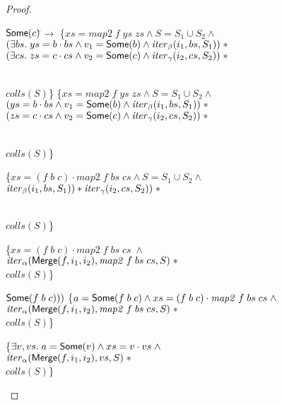 \begin{proof}
\begin{itemize}
\begin{specification}
\nextline \> \;\;\; $\mathsf{Some}(c)$\=$ \to $ 
\nextline \> \> \{$xs = \mathit{map2}\;f\;ys\;zs \land 
                  S = S_1 \cup S_2 \land$ 
\\ \> \> \>\;\;    $(\exists bs.\; ys = b\cdot bs \land v_1 = \mathsf{Some}(b) \land 
                                \mathit{iter}_\beta(i_1, bs, S_1)) \;*$
\\ \> \> \>\;\;    $(\exists cs.\; zs = c\cdot cs \land v_2 = \mathsf{Some}(c) \land 
                                \mathit{iter}_\gamma(i_2, cs, S_2)) \;*$

\\ \> \> \>\;     $\mathit{colls}(S)$\}
\nextline \> \> \{$xs = \mathit{map2}\;f\;ys\;zs \land 
                  S = S_1 \cup S_2 \land$ 
\\ \> \> \>\;    $(ys = b\cdot bs \land v_1 = \mathsf{Some}(b) \land 
                                \mathit{iter}_\beta(i_1, bs, S_1)) \;*$
\\ \> \> \>\;    $(zs = c\cdot cs \land v_2 = \mathsf{Some}(c) \land 
                                \mathit{iter}_\gamma(i_2, cs, S_2)) \;*$

\\ \> \> \>\;     $\mathit{colls}(S)$\}

\nextline \> \> \{$xs = (f\;b\;c) \cdot \mathit{map2}\;f\;bs\;cs \land 
                  S = S_1 \cup S_2 \land$ 
\\ \> \> \>\;    $\mathit{iter}_\beta(i_1, bs, S_1)) * \mathit{iter}_\gamma(i_2, cs, S_2)) \;*$

\\ \> \> \>\;     $\mathit{colls}(S)$\}

\nextline \> \> \{$xs = (f\;b\;c) \cdot \mathit{map2}\;f\;bs\;cs \; \land$
\\ \> \> \>\;    $\mathit{iter}_\alpha(\mathsf{Merge}(f, i_1, i_2), \mathit{map2}\;f\;bs\;cs, S) \;*$
\\ \> \> \>\;     $\mathit{colls}(S)$\}

\nextline \> \> $\mathsf{Some}(f\;b\;c)))$ 
\nextline \> \> \{$a = \mathsf{Some}(f\;b\;c) \land xs = (f\;b\;c) \cdot \mathit{map2}\;f\;bs\;cs \; \land$
\\ \> \> \>\;    $\mathit{iter}_\alpha(\mathsf{Merge}(f, i_1, i_2), \mathit{map2}\;f\;bs\;cs, S) \;*$
\\ \> \> \>\;     $\mathit{colls}(S)$\}

\nextline \> \> \{$\exists v, vs.\; a = \mathsf{Some}(v) \land xs = v \cdot vs \; \land$
\\ \> \> \>\;    $\mathit{iter}_\alpha(\mathsf{Merge}(f, i_1, i_2), vs, S) \;*$
\\ \> \> \>\;     $\mathit{colls}(S)$\}


\end{specification}

\end{itemize}

\end{proof}


